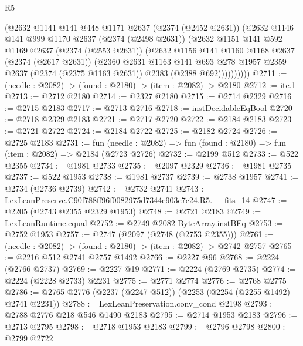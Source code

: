 \begin{lexlean}{R5}
\begin{coremodule}
            (@2632
              @1141
              @141
              @448
              @1171
              @2637
              (@2374 (@2452 @2631))
              (@2632
                @1146
                @141
                @999
                @1170
                @2637
                (@2374 (@2498 @2631))
                (@2632
                  @1151
                  @141
                  @592
                  @1169
                  @2637
                  (@2374 (@2553 @2631))
                  (@2632
                    @1156
                    @141
                    @1160
                    @1168
                    @2637
                    (@2374 (@2617 @2631))
                    (@2360
                      @2631
                      @1163
                      @141
                      @693
                      @278
                      @1957
                      @2359
                      @2637
                      (@2374 (@2375 @1163 @2631))
                      @2383
                      (@2388 @692))))))))))
@2711 := (needle : @2082) -> (found : @2180) -> (item : @2082) -> @2180
@2712 := ite.{1}
@2713 := @2712 @2180
@2714 := @2327 @2180
@2715 := @2714 @2329
@2716 := @2715 @2183
@2717 := @2713 @2716
@2718 := instDecidableEqBool
@2720 := @2718 @2329 @2183
@2721 := @2717 @2720
@2722 := @2184 @2183
@2723 := @2721 @2722
@2724 := @2184 @2722
@2725 := @2182 @2724
@2726 := @2725 @2183
@2731 := fun (needle : @2082) => fun (found : @2180) => fun (item : @2082) => @2184 (@2723 @2726)
@2732 := @2199 @512
@2733 := @522 @2355
@2734 := @1981 @2733
@2735 := @2097 @2329
@2736 := @1981 @2735
@2737 := @522 @1953
@2738 := @1981 @2737
@2739 := @2738 @1957
@2741 := @2734 (@2736 @2739)
@2742 := @2732 @2741
@2743 := LexLeanPreserve.C90f788ff96f0082975d7344e903c7c24.R5.__fits_14
@2747 := @2205 (@2743 @2355 @2329 @1953)
@2748 := @2721 @2183
@2749 := LexLeanRuntime.equal
@2752 := @2749 @2082 ByteArray.instBEq
@2753 := @2752 @1953
@2757 := @2747 (@2097 (@2748 (@2753 @2355)))
@2761 := (needle : @2082) -> (found : @2180) -> (item : @2082) -> @2742 @2757
@2765 := @2216 @512 @2741 @2757 @1492
@2766 := @2227 @96
@2768 := @2224 (@2766 @2737)
@2769 := @2227 @19
@2771 := @2224 (@2769 @2735)
@2774 := @2224 (@2228 @2733) @2231
@2775 := @2771 @2774
@2776 := @2768 @2775
@2786 := @2765 @2776 (@2237 (@2247 @512)) (@2253 (@2254 (@2255 @1492) @2741 @2231))
@2788 := LexLeanPreservation.conv_cond @2198
@2793 := @2788 @2776 @218 @546 @1490 @2183
@2795 := @2714 @1953 @2183
@2796 := @2713 @2795
@2798 := @2718 @1953 @2183
@2799 := @2796 @2798
@2800 := @2799 @2722

\end{coremodule}
\end{lexlean}
